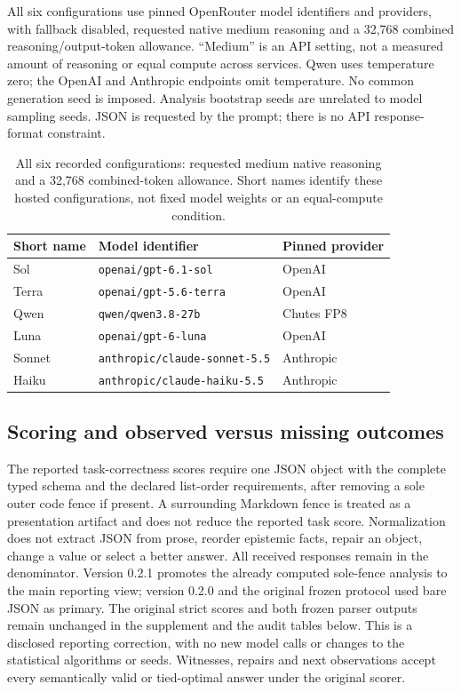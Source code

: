 \documentclass[a4paper,preprint,12pt,numbers,nopreprintline]{elsarticle}
\begin{document}
All six configurations use pinned OpenRouter model identifiers and providers, with fallback disabled, requested native medium reasoning and a 32,768 combined reasoning/output-token allowance. ``Medium'' is an API setting, not a measured amount of reasoning or equal compute across services. Qwen uses temperature zero; the OpenAI and Anthropic endpoints omit temperature. No common generation seed is imposed. Analysis bootstrap seeds are unrelated to model sampling seeds. JSON is requested by the prompt; there is no API response-format constraint.
\begin{table}[htbp]\centering\small
\caption{All six recorded configurations: requested medium native reasoning and a 32,768 combined-token allowance. Short names identify these hosted configurations, not fixed model weights or an equal-compute condition.}\label{tab:configurations}
\setlength{\tabcolsep}{3pt}
\begin{tabular}{lll}\toprule
Short name & Model identifier & Pinned provider\\\midrule
Sol & \texttt{openai/gpt-6.1-sol} & OpenAI\\
Terra & \texttt{openai/gpt-5.6-terra} & OpenAI\\
Qwen & \texttt{qwen/qwen3.8-27b} & Chutes FP8\\
Luna & \texttt{openai/gpt-6-luna} & OpenAI\\
Sonnet & \texttt{anthropic/claude-sonnet-5.5} & Anthropic\\
Haiku & \texttt{anthropic/claude-haiku-5.5} & Anthropic\\
\bottomrule\end{tabular}
\end{table}

\subsection{Scoring and observed versus missing outcomes}
The reported task-correctness scores require one JSON object with the complete typed schema and the declared list-order requirements, after removing a sole outer code fence if present. A surrounding Markdown fence is treated as a presentation artifact and does not reduce the reported task score. Normalization does not extract JSON from prose, reorder epistemic facts, repair an object, change a value or select a better answer. All received responses remain in the denominator. Version 0.2.1 promotes the already computed sole-fence analysis to the main reporting view; version 0.2.0 and the original frozen protocol used bare JSON as primary. The original strict scores and both frozen parser outputs remain unchanged in the supplement and the audit tables below. This is a disclosed reporting correction, with no new model calls or changes to the statistical algorithms or seeds. Witnesses, repairs and next observations accept every semantically valid or tied-optimal answer under the original scorer.
\end{document}
